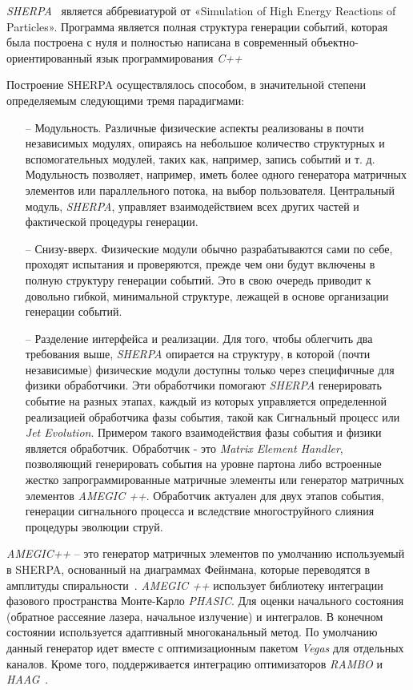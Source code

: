 \textit{SHERPA}~\cite{review-sherpa} является аббревиатурой от «Simulation of High Energy Reactions of Particles». Программа является
полная структура генерации событий, которая была построена с нуля и полностью написана в
современный объектно-ориентированный язык программирования \textit{C++}

Построение SHERPA осуществлялось способом, в значительной степени определяемым следующими тремя парадигмами:

\begin{enumerate}
	\item[--] Модульность. Различные физические аспекты реализованы в почти независимых модулях, опираясь на
	небольшое количество структурных и вспомогательных модулей, таких как, например, запись событий и т. д. Модульность
	позволяет, например, иметь более одного генератора матричных элементов или параллельного потока,
	на выбор пользователя. Центральный модуль, \textit{SHERPA}, управляет взаимодействием
	всех других частей и фактической процедуры генерации.
	\item[--] Снизу-вверх. Физические модули обычно разрабатываются сами по себе, проходят испытания и
	проверяются, прежде чем они будут включены в полную структуру генерации событий. Это в свою очередь
	приводит к довольно гибкой, минимальной структуре, лежащей в основе организации генерации событий.
	\item[--] Разделение интерфейса и реализации. Для того, чтобы облегчить два требования выше,
	\textit{SHERPA} опирается на структуру, в которой (почти независимые) физические модули доступны только
	через специфичные для физики обработчики. Эти обработчики помогают \textit{SHERPA} генерировать событие на разных
	этапах, каждый из которых управляется определенной реализацией обработчика фазы события, такой как
	Сигнальный процесс или \textit{Jet Evolution}. Примером такого взаимодействия фазы события и физики является обработчик. Обработчик - это \textit{Matrix Element Handler}, позволяющий генерировать события на уровне партона либо
	встроенные жестко запрограммированные матричные элементы или генератор матричных элементов \textit{AMEGIC ++}. Обработчик
	актуален для двух этапов события, генерации сигнального процесса и вследствие многоструйного слияния процедуры эволюции струй.
\end{enumerate}

\textit{AMEGIC++} -- это генератор матричных элементов по умолчанию используемый в SHERPA, основанный на диаграммах Фейнмана, которые переводятся в амплитуды спиральности~\cite{review-sherpa}.\textit{ AMEGIC ++} использует библиотеку интеграции фазового пространства Монте-Карло \textit{PHASIC}. Для оценки начального состояния (обратное рассеяние лазера, начальное излучение) и интегралов. В конечном состоянии используется адаптивный многоканальный метод. По умолчанию данный генератор идет вместе с оптимизационным пакетом \textit{Vegas} для отдельных каналов. Кроме того, поддерживается интеграцию оптимизаторов \textit{RAMBO} и \textit{HAAG}~\cite{review-sherpa}.

